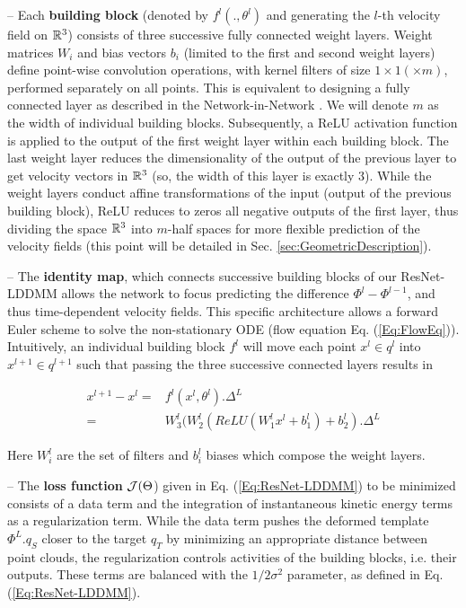 -- Each \textbf{building block} (denoted by $f^l(.,\theta^l)$ and generating the $l$-th velocity field on $\mathbb{R}^3$) consists of three successive fully connected weight layers. Weight matrices $W_i$ and bias vectors $b_i$ (limited to the first and second weight layers) define point-wise convolution operations, with kernel filters of size $1\times 1(\times m)$, performed separately on all points. This is equivalent to designing a fully connected layer as described in the Network-in-Network \cite{lin2014network}. We will denote $m$ as the width of individual building blocks. Subsequently, a ReLU activation function is applied to the output of the first weight layer within each building block. The last weight layer reduces the dimensionality of the output of the previous layer to get velocity vectors in $\mathbb{R}^3$ (so, the width of this layer is exactly $3$).  While the weight layers conduct affine transformations of the input (output of the previous building block), ReLU reduces to zeros all negative outputs of the first layer, thus dividing the space $\mathbb{R}^3$ into $m$-half spaces for more flexible prediction of the velocity fields (this point will be detailed in Sec. \ref{sec:GeometricDescription}). 

-- The \textbf{identity map}, which connects successive building blocks of our ResNet-LDDMM allows the network to focus predicting the difference $\Phi^l-\Phi^{l-1}$, and thus time-dependent velocity fields. This specific architecture allows a forward Euler scheme to solve the non-stationary ODE (flow equation Eq. (\ref{Eq:FlowEq})). Intuitively, an individual building block $f^l$ will move each point $x^l\in q^l$ into $x^{l+1}\in q^{l+1}$ such that passing the three successive connected layers results in

\begin{equation}
\begin{split}
x^{l+1}-x^l=&f^l(x^l,\theta^l).\Delta^L
\\=& W^l_3(W^l_2(ReLU(W^l_1x^l+b^l_1)+b^l_2).\Delta^L
\end{split}
\end{equation}

\noindent Here $W^l_i$ are the set of filters and $b^l_i$ biases which compose the weight layers.%

-- The \textbf{loss function} ${\cal J}(\Theta$) given in Eq. (\ref{Eq:ResNet-LDDMM}) to be minimized consists of a data term and the integration of instantaneous kinetic energy terms as a regularization term. While the data term pushes the deformed template $\Phi^{L}.q_S$ closer to the target $q_T$ by minimizing an appropriate distance between point clouds, the regularization controls activities of the building blocks, i.e. their outputs. These terms are balanced with the $1/2\sigma^2$ parameter, as defined in Eq. (\ref{Eq:ResNet-LDDMM}).

